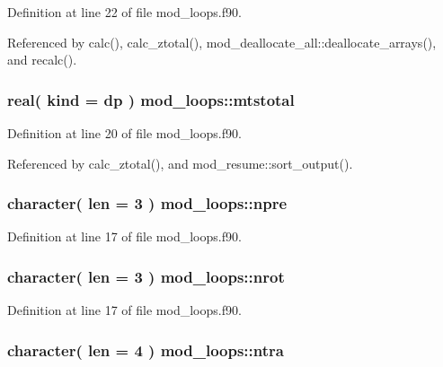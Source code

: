 Definition at line 22 of file mod\+\_\+loops.\+f90.



Referenced by calc(), calc\+\_\+ztotal(), mod\+\_\+deallocate\+\_\+all\+::deallocate\+\_\+arrays(), and recalc().

\subsubsection[{\texorpdfstring{mtstotal}{mtstotal}}]{\setlength{\rightskip}{0pt plus 5cm}real( kind = dp ) mod\+\_\+loops\+::mtstotal}\hypertarget{namespacemod__loops_ae00fd72d753b56050294575eca6b68b1}{}\label{namespacemod__loops_ae00fd72d753b56050294575eca6b68b1}


Definition at line 20 of file mod\+\_\+loops.\+f90.



Referenced by calc\+\_\+ztotal(), and mod\+\_\+resume\+::sort\+\_\+output().

\subsubsection[{\texorpdfstring{npre}{npre}}]{\setlength{\rightskip}{0pt plus 5cm}character( len = 3 ) mod\+\_\+loops\+::npre}\hypertarget{namespacemod__loops_a920fecb79f5e908fa035a810b4d549ea}{}\label{namespacemod__loops_a920fecb79f5e908fa035a810b4d549ea}


Definition at line 17 of file mod\+\_\+loops.\+f90.

\subsubsection[{\texorpdfstring{nrot}{nrot}}]{\setlength{\rightskip}{0pt plus 5cm}character( len = 3 ) mod\+\_\+loops\+::nrot}\hypertarget{namespacemod__loops_a66417533bb22418eb95ee7ebbff1f850}{}\label{namespacemod__loops_a66417533bb22418eb95ee7ebbff1f850}


Definition at line 17 of file mod\+\_\+loops.\+f90.

\subsubsection[{\texorpdfstring{ntra}{ntra}}]{\setlength{\rightskip}{0pt plus 5cm}character( len = 4 ) mod\+\_\+loops\+::ntra}\hypertarget{namespacemod__loops_a79e040eb372f8de350337242a159e2b7}{}\label{namespacemod__loops_a79e040eb372f8de350337242a159e2b7}


